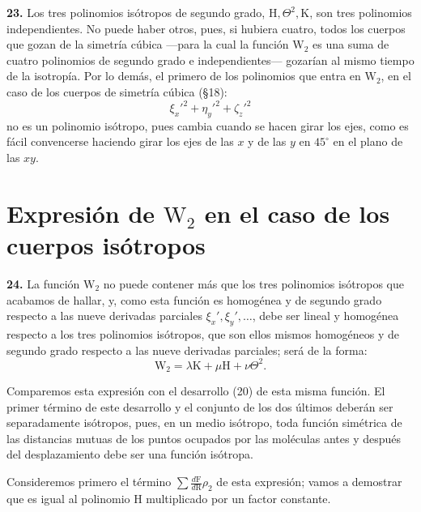 \noindent\textbf{23.} Los tres polinomios isótropos de segundo grado,
$\mathrm{H},\Theta^2,\mathrm{K}$, son tres polinomios independientes. No
puede haber otros, pues, si hubiera cuatro, todos los cuerpos que gozan de
la simetría cúbica —para la cual la función $\mathrm{W}_2$ es una suma de
cuatro polinomios de segundo grado e independientes— gozarían al mismo
tiempo de la isotropía. Por lo demás, el primero de los polinomios que
entra en $\mathrm{W}_2$, en el caso de los cuerpos de simetría cúbica (§18):
\[
\xi_x'^2+\eta_y'^2+\zeta_z'^2
\]
no es un polinomio isótropo, pues cambia cuando se hacen girar los ejes,
como es fácil convencerse haciendo girar los ejes de las $x$ y de las $y$
en $45^\circ$ en el plano de las $xy$.

\section{Expresión de \texorpdfstring{$\mathrm{W}_2$}{W₂} en el caso de los cuerpos isótropos}

\noindent\textbf{24.} La función $\mathrm{W}_2$ no puede contener más que
los tres polinomios isótropos que acabamos de hallar, y, como esta función
es homogénea y de segundo grado respecto a las nueve derivadas parciales
$\xi_x',\xi_y',\ldots$, debe ser lineal y homogénea respecto a los tres
polinomios isótropos, que son ellos mismos homogéneos y de segundo grado
respecto a las nueve derivadas parciales; será de la forma:
\begin{equation}
\mathrm{W}_2=\lambda\mathrm{K}+\mu\mathrm{H}+\nu\Theta^2.
\tag{27}
\end{equation}

Comparemos esta expresión con el desarrollo (20) de esta misma función. El
primer término de este desarrollo y el conjunto de los dos últimos deberán
ser separadamente isótropos, pues, en un medio isótropo, toda función
simétrica de las distancias mutuas de los puntos ocupados por las
moléculas antes y después del desplazamiento debe ser una función isótropa.

Consideremos primero el término $\displaystyle\sum\frac{d\mathrm{F}}{d\mathrm{R}}\rho_2$
de esta expresión; vamos a demostrar que es igual al polinomio $\mathrm{H}$
multiplicado por un factor constante.

